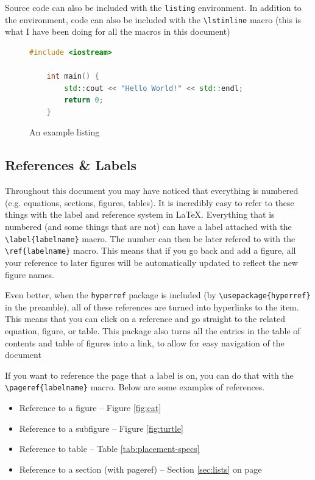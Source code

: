 \documentclass{article}
\begin{document}
Source code can also be included with the \lstinline{listing} environment. In addition to the environment, code can also be included with the \lstinline{\lstinline} macro (this is what I have been doing for all the macros in this document)

\begin{figure}
\caption{An example listing}
\begin{lstlisting}[language=c++,keywordstyle=\color{blue}]
    #include <iostream>

    int main() {
        std::cout << "Hello World!" << std::endl;
        return 0;
    }
\end{lstlisting}
\end{figure}

\subsection{References \& Labels}
Throughout this document you may have noticed that everything is numbered (e.g. equations, sections, figures, tables). It is incredibly easy to refer to these things with the label and reference system in \LaTeX{}. Everything that is numbered (and some things that are not) can have a label attached with the \lstinline|\label{labelname}| macro. The number can then be later refered to with the \lstinline|\ref{labelname}| macro. This means that if you go back and add a figure, all your reference to later figures will be automatically updated to reflect the new figure names.

Even better, when the \lstinline{hyperref} package is included (by \lstinline|\usepackage{hyperref}| in the preamble), all of these references are turned into hyperlinks to the item. This means that you can click on a reference and go straight to the related equation, figure, or table. This package also turns all the entries in the table of contents and table of figures into a link, to allow for easy navigation of the document

If you want to reference the page that a label is on, you can do that with the \lstinline|\pageref{labelname}| macro.
Below are some examples of references.
\begin{itemize}
  \item Reference to a figure -- Figure \ref{fig:cat}
  \item Reference to a subfigure -- Figure \ref{fig:turtle}
  \item Reference to table -- Table \ref{tab:placement-specs}
  \item Reference to a section (with pageref) -- Section \ref{sec:lists} on page \pageref{sec:lists}
\end{itemize}
\end{document}
